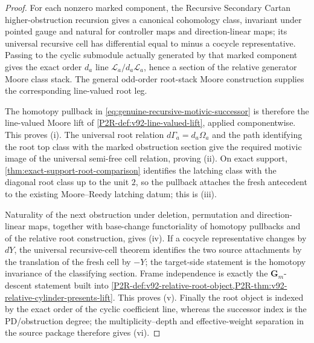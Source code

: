 \documentclass[11pt]{article}
\theoremstyle{remark}
\begin{document}
\begin{proof}
For each nonzero marked component, the Recursive Secondary Cartan higher-obstruction
recursion gives a canonical cohomology class, invariant under pointed gauge and natural
for controller maps and direction-linear maps; its universal recursive cell has
differential equal to minus a cocycle representative.  Passing to the cyclic submodule
actually generated by that marked component gives the exact order $d_a$ line
$\mathscr L_a/d_a\mathscr L_a$, hence a section of the relative generator Moore class
stack.  The general odd-order root-stack Moore construction supplies the corresponding
line-valued root leg.

The homotopy pullback in \eqref{eq:genuine-recursive-motivic-successor} is therefore the
line-valued Moore lift of \cref{P2R-def:v92-line-valued-lift}, applied
componentwise.  This proves (i).  The universal root relation
$d\Gamma_a=d_a\Omega_a$ and the path identifying the root top class with the marked
obstruction section give the required motivic image of the universal semi-free cell
relation, proving (ii).  On exact support, \cref{thm:exact-support-root-comparison}
identifies the latching class with the diagonal root class up to the unit $2$, so the
pullback attaches the fresh antecedent to the existing Moore--Reedy latching datum;
this is (iii).

Naturality of the next obstruction under deletion, permutation and direction-linear maps,
together with base-change functoriality of homotopy pullbacks and of the relative root
construction, gives (iv).  If a cocycle representative changes by $dY$, the universal
recursive-cell theorem identifies the two source attachments by the translation of the
fresh cell by $-Y$; the target-side statement is the homotopy invariance of the classifying
section.  Frame independence is exactly the $\mathbf G_m$-descent statement built into
\cref{P2R-def:v92-relative-root-object,P2R-thm:v92-relative-cylinder-presents-lift}.
This proves (v).  Finally the root object is indexed by the exact order of the cyclic
coefficient line, whereas the successor index is the PD/obstruction degree;
the multiplicity--depth and effective-weight separation in the source package
therefore gives (vi).
\end{proof}
\end{document}
